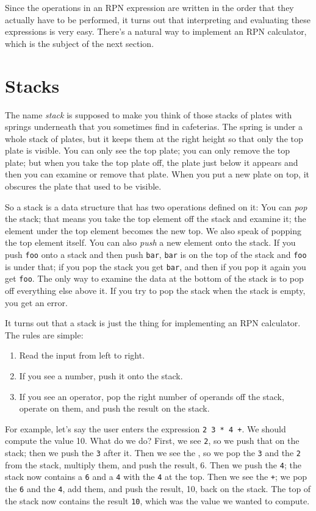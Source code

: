 Since the operations in an RPN expression are written in the order that
they actually have to be performed, it turns out that interpreting and
evaluating these expressions is very easy.  There's a natural way to
implement an RPN calculator, which is the subject of the next section.

\section{Stacks}

The name {\em stack}\/ is supposed to make you think of those stacks of
plates with springs underneath that you sometimes find in cafeterias.
The spring is under a whole stack of plates, but it keeps them at the
right height so that only the top plate is visible.  You can only see
the top plate; you can only remove the top plate; but when you take the
top plate off, the plate just below it appears and then you can examine
or remove that plate.  When you put a new plate on top, it obscures the
plate that used to be visible.

So a stack is a data structure that has two operations defined on it:
You can {\em pop}\/ the stack; that means you take the top element off
the stack and examine it; the element under the top element becomes the
new top.  We also speak of popping the top element itself.  You can also
{\em push}\/ a new element onto the stack.  If you push {\tt foo} onto a
stack and then push {\tt bar}, {\tt bar} is on the top of the stack and
{\tt foo} is under that; if you pop the stack you get {\tt bar}, and
then if you pop it again you get {\tt foo}.  The only way to examine the
data at the bottom of the stack is to pop off everything else above it.
If you try to pop the stack when the stack is empty, you get an error.

It turns out that a stack is just  the thing for implementing an RPN
calculator.  The rules are simple: 
\begin{enumerate}
\item Read the input from left to right. 
\item If you see a number, push it onto the stack.
\item If you see an operator, pop the right number of operands off the
stack, operate on them, and push the result on the stack.
\end{enumerate}

For example, let's say the user enters the expression {\tt 2 3 * 4 +}.
We should compute the value 10.  What do we do?  First, we see {\tt 2},
so we push that on the stack; then we push the {\tt 3} after it.  Then
we see the {\tt *}, so we pop the {\tt 3} and the {\tt 2} from the
stack, multiply them, and push the result, 6.  Then we push the {\tt 4};
the stack now contains a {\tt 6} and a {\tt 4} with the {\tt 4} at the
top.  Then we see the {\tt +}; we pop the {\tt 6} and the {\tt 4}, add
them, and push the result, 10, back on the stack.  The top of the stack
now contains the result {\tt 10}, which was the value we wanted to
compute.

